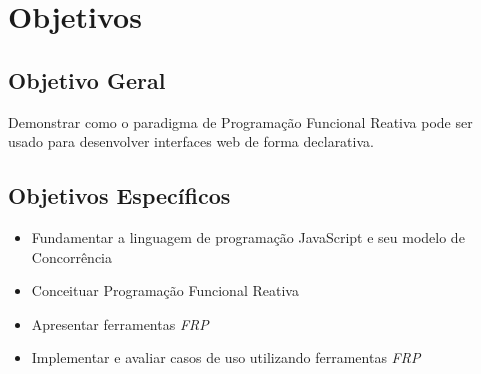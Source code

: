 \section{Objetivos}\label{lobjetivos}

\subsection{Objetivo Geral}
Demonstrar como o paradigma de Programação Funcional Reativa pode ser usado para
desenvolver interfaces web de forma declarativa.

\subsection{Objetivos Específicos}
\begin{itemize}[noitemsep]
  \item Fundamentar a linguagem de programação JavaScript e seu modelo de Concorrência
  \item Conceituar Programação Funcional Reativa
  \item Apresentar ferramentas \textit{FRP}
  \item Implementar e avaliar casos de uso utilizando ferramentas \textit{FRP}
\end{itemize}
